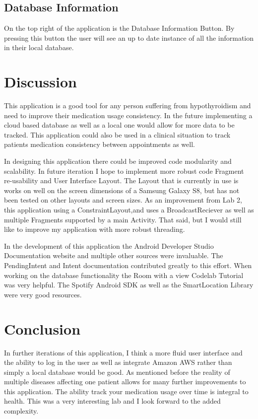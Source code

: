 \documentclass{article}
\begin{document}
\subsection{Database Information}
On the top right of the application is the Database Information Button. By pressing this button the user will see an up to date instance of all the information in their local database.

\section{Discussion}
This application is a good tool for any person suffering from hypothyroidism and need to improve their medication usage consistency. In the future implementing a cloud based database as well as a local one would allow for more data to be tracked. This application could also be used in a clinical situation to track patients medication consistency between appointments as well.

In designing this application there could be improved code modularity and scalability. In future iteration I hope to implement more robust code Fragment re-usability and User Interface Layout. The Layout that is currently in use is works on well on the screen dimensions of a Samsung Galaxy S8, but has not been tested on other layouts and screen sizes. As an improvement from Lab 2, this application using a ConstraintLayout,and uses a BroadcastReciever as well as multiple Fragments supported by a main Activity. That said, but I would still like to improve my application with more robust threading. 

In the development of this application the Android Developer Studio Documentation website and multiple other sources were invaluable.\citep{AndroidDocs} The PendingIntent and Intent documentation contributed greatly to this effort. \citep{IntentDocs} When working on the database functionality the Room with a view Codelab Tutorial was very helpful.\citep{Room} The Spotify Android SDK as well as the SmartLocation Library were very good resources.\citep{SmartLocation}

\section{Conclusion}
In further iterations of this application, I think a more fluid user interface and the ability to log in the user as well as integrate Amazon AWS rather than simply a local database would be good. As mentioned before the reality of multiple diseases affecting one patient allows for many further improvements to this application. The ability track your medication usage over time is integral to health. This was a very interesting lab and I look forward to the added complexity. 



\end{document}
